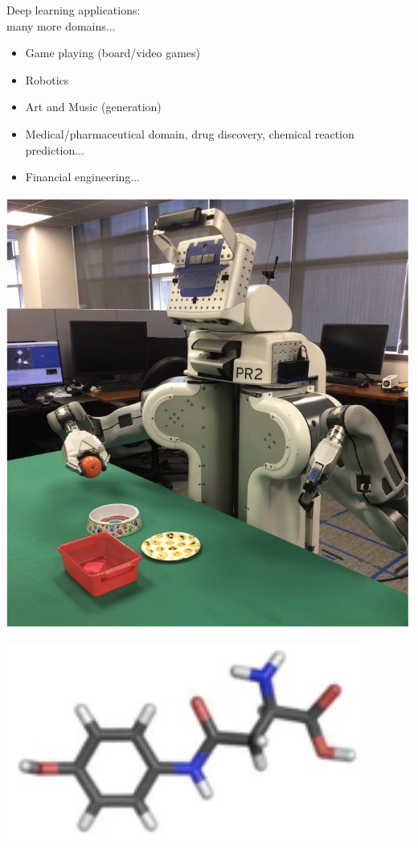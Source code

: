 \begin{frame}{Deep learning  applications:\\
many more domains...}
\begin{itemize}
\item Game playing (board/video games)
\item Robotics
\item Art and Music (generation)
\item Medical/pharmaceutical domain, drug discovery, chemical reaction prediction...
\item Financial engineering...
\end{itemize}
\vspace{3mm}
\begin{minipage}{0.3\linewidth}
  \begin{center}
    \includegraphics[height=0.5\textheight]{figures/applications/robot-manip.png}
  \end{center}
\end{minipage}
\begin{minipage}{0.25\linewidth}
  \begin{center}
    \includegraphics[height=0.2\textheight]{figures/applications/molecule.png}

\end{center}
\end{minipage}
\end{frame}
